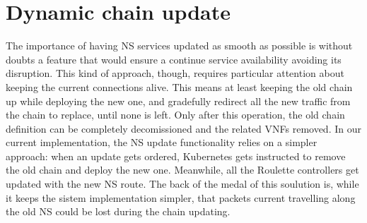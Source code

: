 \section{Dynamic chain update}

The importance of having NS services updated as smooth as possible is without 
doubts a feature that would ensure a continue service availability avoiding its 
disruption. This kind of approach, though, requires particular attention about 
keeping the current connections alive. This means at least keeping the old 
chain up while deploying the new one, and gradefully redirect all the 
new traffic from the chain to replace, until none is left. Only after this 
operation, the old chain definition can be completely decomissioned and the 
related VNFs removed. In our current implementation, the NS update 
functionality relies on a simpler approach: when an update gets ordered, 
Kubernetes gets instructed to remove the old chain and deploy the new one. 
Meanwhile, all the Roulette controllers get updated with the new NS route. The 
back of the medal of this soulution is, while it keeps the sistem implementation 
simpler, that packets current travelling along the old NS could be lost during 
the chain updating.
